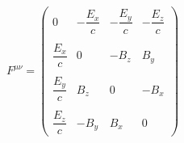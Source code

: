 \documentclass[preview]{standalone}
\begin{document}
\begin{align*}
F^{\mu\nu} = \begin{pmatrix} 0 & - \dfrac{E_{x}}{c} & - \dfrac{E_{y}}{c} & - \dfrac{E_{z}}{c} \\ \
                          &&& \\ \dfrac{E_{x}}{c} & 0 & - B_{z} & B_{y} \\ \
                          &&& \\ \dfrac{E_{y}}{c} &  B_{z} & 0 & - B_{x} \\ &&& \\ \dfrac{E_{z}}{c} &  -B_{y} & B_{x} & 0 \end{pmatrix}
\end{align*}
\end{document}
